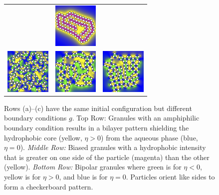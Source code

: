 \begin{figure}
\begin{center}
\begin{tabular}{m{0.9in}m{0.9in}m{0.9in}}
      &\includegraphics[width=0.85in]{figures/SpecificAim1/N100C3.jpg}    \\
      \includegraphics[width=0.85in]{figures/SpecificAim1/N100A1.jpg}
      &\includegraphics[width=0.85in]{figures/SpecificAim1/N100A2.jpg}
      &\includegraphics[width=0.85in]{figures/SpecificAim1/N100A3.jpg} 
  \end{tabular}
  \end{center}
  \vspace{-5pt}
  \caption{\footnotesize \label{fig:self-assembly2} Rows (a)--(c) have
  the same initial configuration but different boundary conditions $g$.
  {Top Row:} Granules with an amphiphilic boundary condition
  results in a bilayer pattern shielding the hydrophobic core (yellow,
  $\eta > 0$) from the aqueous phase (blue, $\eta = 0$). {\em Middle
  Row:} Biased granules with a hydrophobic intensity that is greater on
  one side of the particle (magenta) than the other (yellow). {\em
  Bottom Row:} Bipolar granules where green is for $\eta < 0$, yellow is
  for $\eta > 0$, and blue is for $\eta = 0$. Particles orient like
  sides to form a checkerboard pattern.}
\end{figure}

